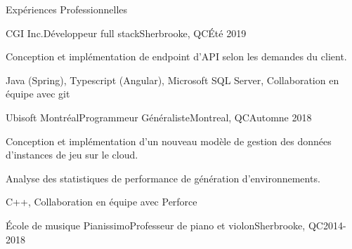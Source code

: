 \documentclass{article}
\newlength{\tabin}
\newlength{\secsep}
\newcommand{\lineunder}{\vspace*{-8pt} \\ \hspace*{-6pt} \hrulefill \\ \vspace*{-15pt}}
\newenvironment{tabbedsection}[1]{
  \begin{list}{}{
      \setlength{\itemsep}{0pt}
      \setlength{\labelsep}{0pt}
      \setlength{\labelwidth}{0pt}
      \setlength{\leftmargin}{\tabin}
      \setlength{\rightmargin}{\tabin}
      \setlength{\listparindent}{0pt}
      \setlength{\parsep}{0pt}
      \setlength{\parskip}{0pt}
      \setlength{\partopsep}{0pt}
      \setlength{\topsep}{#1}
    }
  \item[]
}{\end{list}}
\newenvironment{resume_section}[1]{
  \filbreak
  \vspace{2\secsep}
  \textsc{\large#1}
  \lineunder
  \begin{tabbedsection}{\secsep}
}{\end{tabbedsection}}
\newenvironment{subitems}{
  \renewcommand{\labelitemi}{-}
  \begin{itemize}
      \setlength{\labelsep}{1em}
}{\end{itemize}}
\newenvironment{resume_employer}[4]{
  \vspace{\secsep}
  \textbf{#1} \\ 
  \indent {\small #2} \hfill {\footnotesize#3 (#4)}
  \begin{tabbedsection}{0pt}
  \begin{subitems}
}{\end{subitems}\end{tabbedsection}}
\begin{document}
\begin{resume_section}{Expériences Professionnelles}
  \begin{resume_employer}{CGI Inc.}{Développeur full stack}{Sherbrooke, QC}{Été 2019}
    \item Conception et implémentation de endpoint d'API selon les demandes du client.
    \item Java (Spring), Typescript (Angular), Microsoft SQL Server, Collaboration en équipe avec git
  \end{resume_employer}
  
    \begin{resume_employer}{Ubisoft Montréal}{Programmeur Généraliste}{Montreal, QC}{Automne 2018}
    \item Conception et implémentation d'un nouveau modèle de gestion des données d'instances de jeu sur le cloud.
    \item Analyse des statistiques de performance de génération d'environnements.
    \item C++, Collaboration en équipe avec Perforce
  \end{resume_employer}
  
  \begin{resume_employer}{École de musique Pianissimo}{Professeur de piano et violon}{Sherbrooke, QC}{2014-2018}
  \end{resume_employer}
\end{resume_section}
\end{document}
